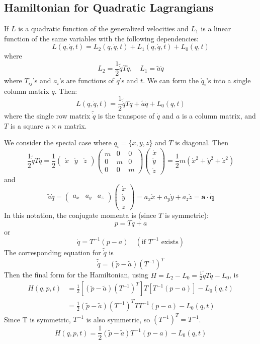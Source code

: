 \documentclass[12pt]{article}
\begin{document}
	\subsection{ Hamiltonian for Quadratic Lagrangians}
	If $L$ is a quadratic function of the generalized velocities and $L_1$ is a linear function of the same variables with the following dependencies:
	$$
	L(q, \dot{q}, t) = L_2(q, \dot{q}, t) + L_1(q, \dot{q}, t) + L_0(q, t)
	$$
	where
	$$
	L_2 = \frac{1}{2} \tilde{\dot{q}} T \dot{q}, \quad L_1 = \tilde{a} \dot{q}
	$$
	where $T_{ij}$'s and $a_i$'s are functions of $q$'s and $t$.
	We can form the $\dot{q}_i$'s into a single column matrix $\dot{q}$. Then:
	$$
	L(q, \dot{q}, t) = \frac{1}{2} \tilde{\dot{q}} T \dot{q} + \tilde{a} \dot{q} + L_0(q,t)
	$$
	where the single row matrix $\tilde{\dot{q}}$ is the transpose of $\dot{q}$ and $a$ is a column matrix, and $T$ is a square $n \times n$ matrix.
	
	We consider the special case where $q_i = \{x, y, z\}$ and $T$ is diagonal.
	Then
	$$
	\frac{1}{2} \tilde{\dot{q}} T \dot{q} = \frac{1}{2} \begin{pmatrix} \dot{x} & \dot{y} & \dot{z} \end{pmatrix} \begin{pmatrix} m & 0 & 0 \\ 0 & m & 0 \\ 0 & 0 & m \end{pmatrix} \begin{pmatrix} \dot{x} \\ \dot{y} \\ \dot{z} \end{pmatrix} = \frac{1}{2} m (\dot{x}^2 + \dot{y}^2 + \dot{z}^2)
	$$
	and
	$$
	\tilde{a} \dot{q} = \begin{pmatrix} a_x & a_y & a_z \end{pmatrix} \begin{pmatrix} \dot{x} \\ \dot{y} \\ \dot{z} \end{pmatrix} = a_x \dot{x} + a_y \dot{y} + a_z \dot{z} = \mathbf{a} \cdot \mathbf{\dot{q}}
	$$
	In this notation, the conjugate momenta is (since $T$ is symmetric):
	$$
	p = T\dot{q} + a
	$$
	or
	$$
	\dot{q} = T^{-1}(p-a) \quad (\text{if } T^{-1} \text{ exists})
	$$
	The corresponding equation for $\tilde{\dot{q}}$ is
	$$
	\tilde{\dot{q}} = (\tilde{p} - \tilde{a}) (T^{-1})^T
	$$
	Then the final form for the Hamiltonian, using $H = L_2 - L_0 = \frac{1}{2}\tilde{\dot{q}}T\dot{q} - L_0$, is
	\begin{align*}
		H(q, p, t) &= \frac{1}{2} \left[ (\tilde{p} - \tilde{a}) (T^{-1})^T \right] T \left[ T^{-1} (p - a) \right] - L_0(q, t) \\
		&= \frac{1}{2} (\tilde{p} - \tilde{a}) (T^{-1})^T T T^{-1} (p - a) - L_0(q, t)
	\end{align*}
	Since T is symmetric, $T^{-1}$ is also symmetric, so $(T^{-1})^T = T^{-1}$.
	$$
	H(q, p, t) = \frac{1}{2} (\tilde{p} - \tilde{a}) T^{-1} (p - a) - L_0(q, t)
	$$
\end{document}
